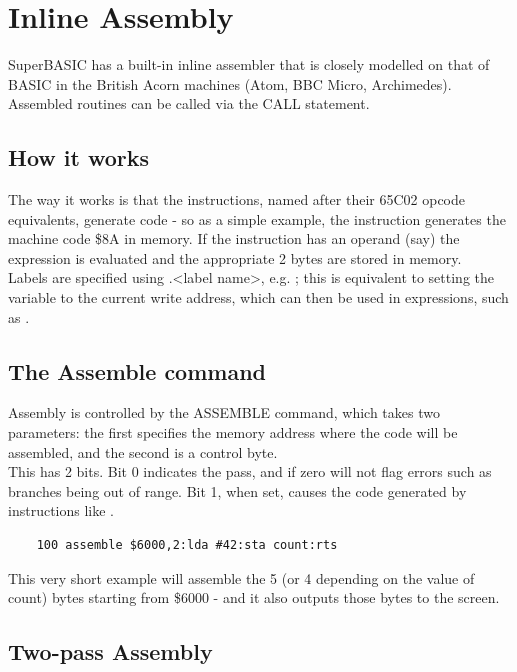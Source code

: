 \chapter{Inline Assembly}

SuperBASIC has a built-in inline assembler that is closely modelled on that of BASIC in the British Acorn machines (Atom, BBC Micro, Archimedes). Assembled routines can be called via the CALL statement.\\

\section{How it works}

The way it works is that the instructions, named after their 65C02 opcode equivalents, generate code - so as a simple example, the instruction  generates the machine code \$8A in memory. If the instruction has an operand (say)  the expression is evaluated and the appropriate 2 bytes are stored in memory. \\

Labels are specified using .<label name>, e.g. ; this is equivalent to setting the variable  to the current write address, which can then be used in expressions, such as .

\section {The Assemble command}

Assembly is controlled by the ASSEMBLE command, which takes two parameters: the first specifies the memory address where the code will be assembled, and the second is a control byte.\\

This has 2 bits.  Bit 0 indicates the pass, and if zero will not flag errors such as branches being out of range. Bit 1, when set, causes the code generated by instructions like .

\begin{verbatim}
	100 assemble $6000,2:lda #42:sta count:rts
\end{verbatim}

This very short example will assemble the 5 (or 4 depending on the value of count) bytes starting from \$6000 - and it also outputs those bytes to the screen. \\

\section {Two-pass Assembly}

